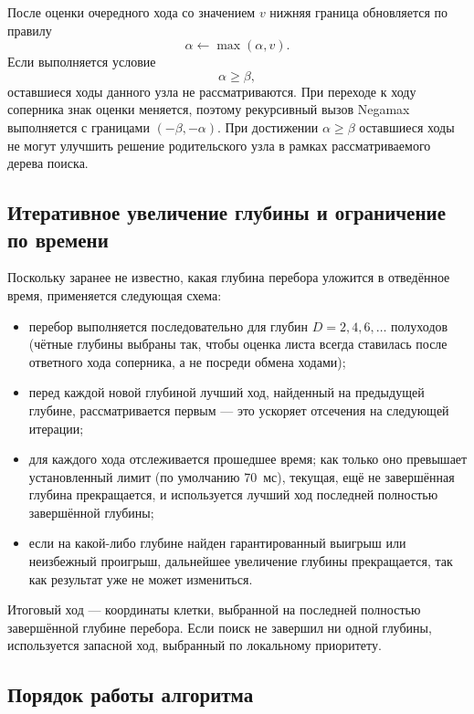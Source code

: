 \documentclass[14pt,a4paper]{extarticle}
\begin{document}
	После оценки очередного хода со значением $v$ нижняя граница обновляется по правилу
	\begin{equation}\label{eq:alpha-update}
		\alpha\leftarrow\max(\alpha,v).
	\end{equation}
	Если выполняется условие
	\begin{equation}\label{eq:alpha-prune}
		\alpha\ge\beta,
	\end{equation}
	оставшиеся ходы данного узла не рассматриваются. При переходе к ходу соперника знак оценки меняется, поэтому рекурсивный вызов Negamax выполняется с границами $(-\beta,-\alpha)$. При достижении $\alpha\ge\beta$ оставшиеся ходы не могут улучшить решение родительского узла в рамках рассматриваемого дерева поиска.
	
	\subsection{Итеративное увеличение глубины и ограничение по времени}
	
	Поскольку заранее не известно, какая глубина перебора уложится в отведённое время, применяется следующая схема:
	\begin{itemize}
		\item перебор выполняется последовательно для глубин $D=2,4,6,\dots$ полуходов (чётные глубины выбраны так, чтобы оценка листа всегда ставилась после ответного хода соперника, а не посреди обмена ходами);
		\item перед каждой новой глубиной лучший ход, найденный на предыдущей глубине, рассматривается первым --- это ускоряет отсечения на следующей итерации;
		\item для каждого хода отслеживается прошедшее время; как только оно превышает установленный лимит (по умолчанию 70~мс), текущая, ещё не завершённая глубина прекращается, и используется лучший ход последней полностью завершённой глубины;
		\item если на какой-либо глубине найден гарантированный выигрыш или неизбежный проигрыш, дальнейшее увеличение глубины прекращается, так как результат уже не может измениться.
	\end{itemize}
	Итоговый ход --- координаты клетки, выбранной на последней полностью завершённой глубине перебора. Если поиск не завершил ни одной глубины, используется запасной ход, выбранный по локальному приоритету.
	
	\subsection{Порядок работы алгоритма}
	
\end{document}
